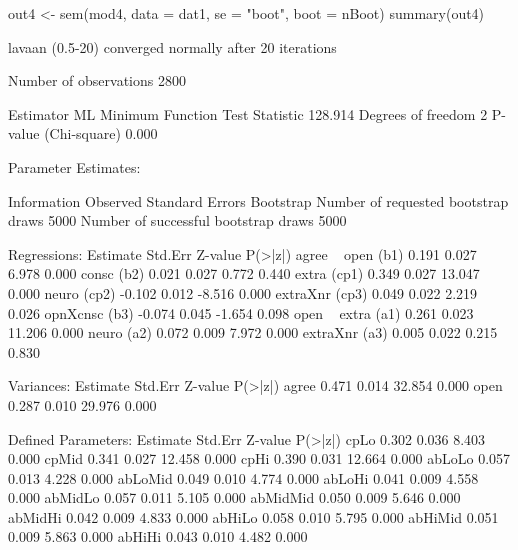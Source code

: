 \begin{Schunk}
\begin{Sinput}
 out4 <- sem(mod4, data = dat1, se = "boot", boot = nBoot)
 summary(out4)
\end{Sinput}
\begin{Soutput}
lavaan (0.5-20) converged normally after  20 iterations

  Number of observations                          2800

  Estimator                                         ML
  Minimum Function Test Statistic              128.914
  Degrees of freedom                                 2
  P-value (Chi-square)                           0.000

Parameter Estimates:

  Information                                 Observed
  Standard Errors                            Bootstrap
  Number of requested bootstrap draws             5000
  Number of successful bootstrap draws            5000

Regressions:
                   Estimate  Std.Err  Z-value  P(>|z|)
  agree ~                                             
    open      (b1)    0.191    0.027    6.978    0.000
    consc     (b2)    0.021    0.027    0.772    0.440
    extra    (cp1)    0.349    0.027   13.047    0.000
    neuro    (cp2)   -0.102    0.012   -8.516    0.000
    extraXnr (cp3)    0.049    0.022    2.219    0.026
    opnXcnsc  (b3)   -0.074    0.045   -1.654    0.098
  open ~                                              
    extra     (a1)    0.261    0.023   11.206    0.000
    neuro     (a2)    0.072    0.009    7.972    0.000
    extraXnr  (a3)    0.005    0.022    0.215    0.830

Variances:
                   Estimate  Std.Err  Z-value  P(>|z|)
    agree             0.471    0.014   32.854    0.000
    open              0.287    0.010   29.976    0.000

Defined Parameters:
                   Estimate  Std.Err  Z-value  P(>|z|)
    cpLo              0.302    0.036    8.403    0.000
    cpMid             0.341    0.027   12.458    0.000
    cpHi              0.390    0.031   12.664    0.000
    abLoLo            0.057    0.013    4.228    0.000
    abLoMid           0.049    0.010    4.774    0.000
    abLoHi            0.041    0.009    4.558    0.000
    abMidLo           0.057    0.011    5.105    0.000
    abMidMid          0.050    0.009    5.646    0.000
    abMidHi           0.042    0.009    4.833    0.000
    abHiLo            0.058    0.010    5.795    0.000
    abHiMid           0.051    0.009    5.863    0.000
    abHiHi            0.043    0.010    4.482    0.000
\end{Soutput}
\end{Schunk}

